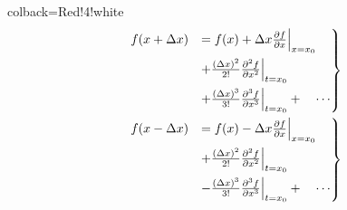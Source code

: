 \documentclass[UTF8,
no-math,
12pt,
openany,
table,
dvipsnames,
svgnames]{article}
\begin{document}
\begin{tcblisting}{colback=Red!4!white}
\begin{align*}
\begin{rcases}
f(x+\Delta x) & = f(x) + \Delta x\frac{\partial f}{\partial x}\Big{|}_{x=x_0}\\
              & + \frac{(\Delta x)^2}{2!} \frac{\partial^2 f}{\partial x^2}\Big{|}_{t=x_0}\\
              & + \frac{(\Delta x)^3}{3!} \frac{\partial^3 f}{\partial x^3}\Big{|}_{t=x_0}+\quad\cdots
\end{rcases}\\
\begin{rcases}
f(x-\Delta x) & = f(x) - \Delta x\frac{\partial f}{\partial x}\Big{|}_{x=x_0} \\
              & +\frac{(\Delta x)^2}{2!} \frac{\partial^2 f}{\partial x^2}\Big{|}_{t=x_0}\\
              & -\frac{(\Delta x)^3}{3!} \frac{\partial^3 f}{\partial x^3}\Big{|}_{t=x_0}+\quad\cdots
\end{rcases}
\end{align*}
\end{tcblisting}
\end{document}

